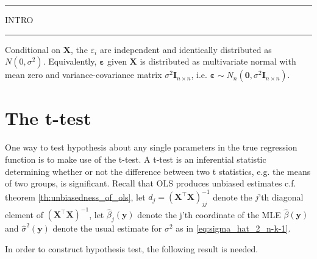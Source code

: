 \hrule
\begin{center}
INTRO
\end{center}
\hrule
\begin{assumption} \label{as:normality_of_errors}
    Conditional on $\mathbf{X}$, the $\varepsilon_i$ are independent and identically distributed as $N(0, \sigma^2)$. Equivalently, $\boldsymbol{\varepsilon}$ given $\mathbf{X}$ is distributed as multivariate normal with mean zero and variance-covariance matrix $\sigma^2 \mathbf{I}_{n \times n}$, i.e. $\boldsymbol{\varepsilon} \sim N_n(\mathbf{0}, \sigma^2 \mathbf{I}_{n \times n})$.
\end{assumption}

\section{The t-test}
One way to test hypothesis about any single parameters in the true regression function is to make use of the t-test. 
A t-test is an inferential statistic determining whether or not the difference between two t statistics, e.g. the means of two groups, is significant. 
Recall that OLS produces unbiased estimates c.f. theorem \ref{th:unbiasedness_of_ols}, let $d_j=(\textbf{X}^\top\textbf{X})^{-1}_{jj}$ denote the $j$'th diagonal element of $(\textbf{X}^\top \textbf{X})^{-1}$, let $\hat{\beta}_j(\textbf{y})$ denote the j'th coordinate of the MLE $\hat{\beta}(\textbf{y})$ and $\hat{\sigma}^2(\textbf{y})$ denote the usual estimate for $\sigma^2$ as in \eqref{eq:sigma_hat_2_n-k-1}.

In order to construct hypothesis test, the following result is needed.

